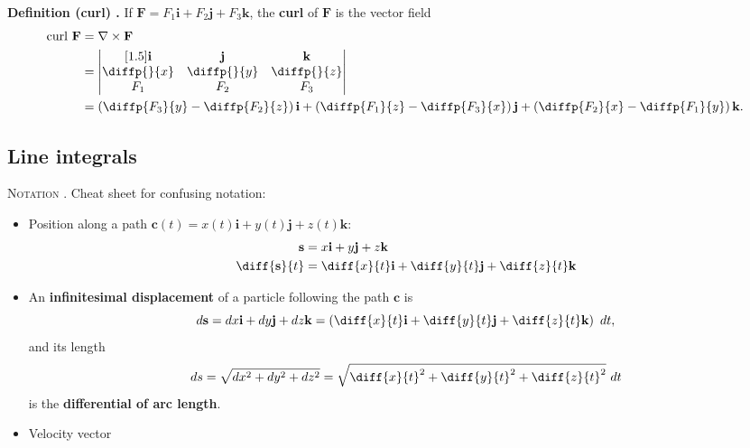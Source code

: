 \begin{shaded}
\textbf{Definition (curl) \cite{math2111_notes}.} If $\mathbf{F} = F_1 \mathbf{i} + F_2 \mathbf{j} + F_3 \mathbf{k}$, the \textbf{curl} of $\mathbf{F}$ is the vector field
\begin{align*}
\text{curl} \ \mathbf{F} &= \nabla \times \mathbf{F} \\
&= \begin{vmatrix}[1.5]
	\mathbf{i} & \mathbf{j} & \mathbf{k} \\
	\diffp{}{x} & \diffp{}{y} & \diffp{}{z} \\
	F_1 & F_2 & F_3
\end{vmatrix} \\
&= \left( \diffp{F_3}{y} - \diffp{F_2}{z} \right) \mathbf{i} + \left( \diffp{F_1}{z} - \diffp{F_3}{x} \right) \mathbf{j} + \left( \diffp{F_2}{x} - \diffp{F_1}{y} \right) \mathbf{k} .
\end{align*}
\end{shaded}

\subsection{Line integrals}

\textsc{Notation \cite{marsden_vector_calculus}.} Cheat sheet for confusing notation:
\begin{itemize}
	\item Position along a path $\mathbf{c}(t) = x(t) \mathbf{i} + y(t) \mathbf{j} + z(t) \mathbf{k}$:
\begin{align*}
\mathbf{s} &= x \mathbf{i} + y \mathbf{j} + z \mathbf{k} \\
\diff{\mathbf{s}}{t} &= \diff{x}{t} \mathbf{i} + \diff{y}{t} \mathbf{j} + \diff{z}{t} \mathbf{k}
\end{align*}
	\item An \textbf{infinitesimal displacement} of a particle following the path $\mathbf{c}$ is
$$ d \mathbf{s} = dx \mathbf{i} + dy \mathbf{j} + dz \mathbf{k} = \left( \diff{x}{t} \mathbf{i} + \diff{y}{t} \mathbf{j} + \diff{z}{t} \mathbf{k} \right) \ dt , $$
and its length
$$ ds = \sqrt{dx^2 + dy^2 + dz^2} = \sqrt{{\diff{x}{t}}^2 + {\diff{y}{t}}^2 + {\diff{z}{t}}^2} \ dt $$
is the \textbf{differential of arc length}.
	\item Velocity vector
\end{itemize}

